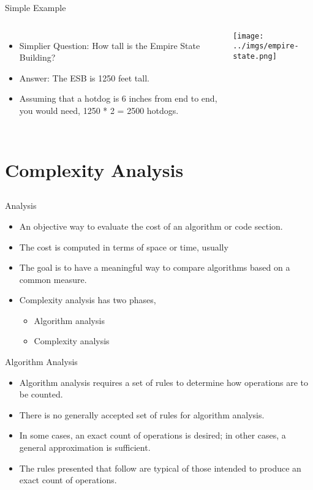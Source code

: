 \documentclass{beamer}
\begin{document}
\begin{frame}{Simple Example}
\begin{columns}
\begin{itemize}
\item Simplier Question: How tall is the Empire State Building?
\item Answer: The ESB is 1250 feet tall.
\item Assuming that a hotdog is 6 inches from end to end, you would need, 1250 * 2 = 2500 hotdogs.
\end{itemize}
\texttt{[image: ../imgs/empire-state.png]}
\end{columns}
\end{frame}

\section{Complexity Analysis}
\subsection{}
\begin{frame}{Analysis}
\begin{itemize}
\item An objective way to evaluate the cost of an algorithm or code section.  
\item The cost is computed in terms of space or time, usually
\item The goal is to have a meaningful way to compare algorithms based on a common measure.
\item Complexity analysis has two phases,
\begin{itemize}
\item Algorithm analysis
\item Complexity analysis
\end{itemize}
\end{itemize}
\end{frame}

\begin{frame}{Algorithm Analysis}
\begin{itemize}
\item Algorithm analysis requires a set of rules to determine how operations are to be counted.
\item There is no generally accepted set of rules for algorithm analysis.
\item In some cases, an exact count of operations is desired; in other cases, a general approximation is sufficient.
\item The rules presented that follow are typical of those intended to produce an exact count of operations.
\end{itemize}
\end{frame}
\end{document}
